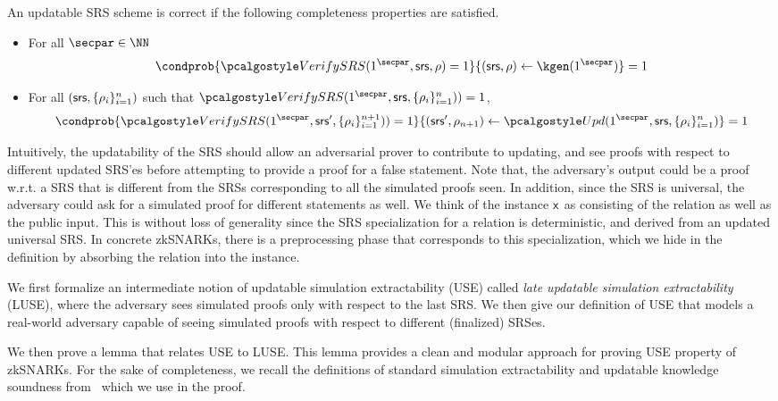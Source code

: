 \begin{definition}
	An updatable SRS scheme is correct if the following completeness properties are satisfied.
	
	\begin{itemize}
		
		\item
		For all $\secpar \in \NN$
		\[
		\condprob{\verifyCRS(1^\secpar,\srs,\rho) = 1}{(\srs,\rho) \leftarrow \kgen(1^\secpar)} = 1
		\]
		\item
		
		For all $(\mathsf{srs},\{\rho_i \}_{i=1}^n)$ such that $\verifyCRS(1^\secpar,\srs,\{\rho_i \}_{i=1}^n))=1$,
		\[
		\condprob{\verifyCRS(1^\secpar,\srs',\{\rho_i \}_{i=1}^{n+1}))=1}{(\srs',\rho_{n+1}) \leftarrow \upd(1^\secpar,\srs,\{\rho_i \}_{i=1}^n)} = 1
		\]
		
	\end{itemize}
\end{definition} 


Intuitively, the updatability of the SRS should allow an adversarial prover to contribute to updating, and see proofs with respect to different updated SRS'es before attempting to provide a proof for a false statement. Note that, the adversary's output could be a proof w.r.t. a SRS that is different from the SRSs corresponding to all the simulated proofs seen. In addition, since the SRS is universal, the adversary could ask for a simulated proof for different statements as well. We think of the instance $\mathsf{x}$ as consisting of the relation as well as the public input. This is without loss of generality since the SRS specialization for a relation is deterministic, and derived from an updated universal SRS. In concrete zkSNARKs, there is a preprocessing phase that corresponds to this specialization, which we hide in the definition by absorbing the relation into the instance.

We first formalize an intermediate notion of updatable simulation extractability (USE) called \emph{late updatable simulation extractability} (LUSE), where the adversary sees simulated proofs only with respect to the last SRS. We then give our definition of USE that models a real-world adversary capable of seeing simulated proofs with respect to different (finalized) SRSes.

We then prove a lemma that relates USE to LUSE. This lemma provides a clean and modular approach for proving USE property of zkSNARKs. 
For the sake of completeness, we recall the definitions of standard simulation extractability and updatable knowledge soundness from~\cite{C:GKMMM18} which we use in the proof.

